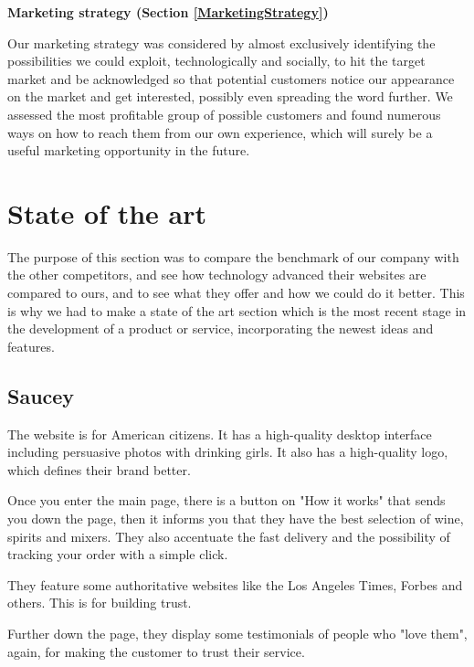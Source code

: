 \documentclass[12p]{article}
\begin{document}
\textbf{Marketing strategy (Section \ref{MarketingStrategy})}

Our marketing strategy was considered by almost exclusively identifying the possibilities we could exploit, technologically and socially, to hit the target market and be acknowledged so that potential customers notice our appearance on the market and get interested, possibly even spreading the word further. We assessed the most profitable group of possible customers and found numerous ways on how to reach them from our own experience, which will surely be a useful marketing opportunity in the future.


\newpage
\section{State of the art}

The purpose of this section was to compare the benchmark of our company with the other competitors, and see how technology advanced their websites are compared to ours, and to see what they offer and how we could do it better.
This is why we had to make a state of the art section which is the most recent stage in the development of a product or service, incorporating the newest ideas and features.

\subsection{Saucey \cite{Saucey}}
The website is for American citizens. It has a high-quality desktop interface including persuasive photos with drinking girls. It also has a high-quality logo, which defines their brand better.

Once you enter the main page, there is a button on "How it works" that sends you down the page, then it informs you that they have the best selection of wine, spirits and mixers. They also accentuate the fast delivery and the possibility of tracking your order with a simple click.

They feature some authoritative websites like the Los Angeles Times, Forbes and others. This is for building trust.

Further down the page, they display some testimonials of people who "love them", again, for making the customer to trust their service.
\end{document}
